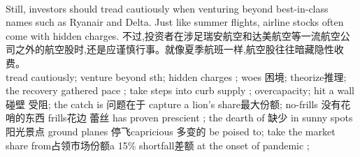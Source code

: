 \documentclass[a4paper,12pt]{article}
\begin{document}
\\Still, investors should tread cautiously when venturing beyond best-in-class names such as Ryanair and Delta. Just like summer flights, airline stocks often come with hidden charges.
不过,投资者在涉足瑞安航空和达美航空等一流航空公司之外的航空股时,还是应谨慎行事。就像夏季航班一样,航空股往往暗藏隐性收费。
\\tread cautiously;
venture beyond sth;
hidden charges ;
woes 困境;
theorize推理;
the recovery gathered pace ;
take steps into curb supply ; 
overcapacity; 
hit a wall碰壁 受阻;
the catch is 问题在于 capture a lion's share最大份额;
no-frills 没有花哨的东西 frills花边 蕾丝 has proven prescient ;
the dearth of 缺少 in sunny spots 阳光景点 ground planes 停飞capricious 多变的 be poised to;
take the market share from占领市场份额a 15\% shortfall差额 at the onset of pandemic ;
\end{document}
